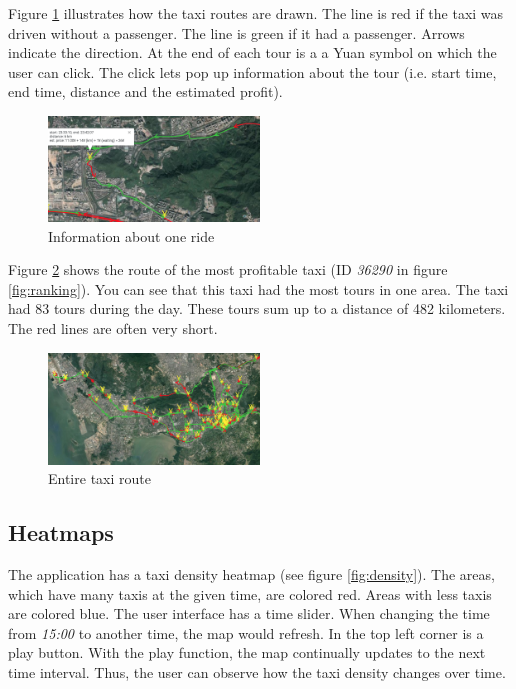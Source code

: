 \documentclass[10pt]{sig-alternate}
\begin{document}
Figure \ref{fig:single_ride} illustrates how the taxi routes are drawn. The line is red if the taxi was driven without a passenger. The line is green if it had a passenger. Arrows indicate the direction. At the end of each tour is a a Yuan symbol on which the user can click. The click lets pop up information about the tour (i.e. start time, end time, distance and the estimated profit).\\

\begin{figure}[ht]
\centering
\includegraphics[width=0.5\textwidth]{img/single_ride.png}
\caption{Information about one ride}
\label{fig:single_ride}
\end{figure}

Figure \ref{fig:best_taxi} shows the route of the most profitable taxi (ID \textit{36290} in figure \ref{fig:ranking}). You can see that this taxi had the most tours in one area. The taxi had 83 tours during the day. These tours sum up to a distance of 482 kilometers. The red lines are often very short.

\begin{figure}[ht]
\centering
\includegraphics[width=0.5\textwidth]{img/best_taxi.png}
\caption{Entire taxi route}
\label{fig:best_taxi}
\end{figure}

\subsection{Heatmaps}
\label{sec:heatmaps}

The application has a taxi density heatmap (see figure \ref{fig:density}). The areas, which have many taxis at the given time, are colored red. Areas with less taxis are colored blue. The user interface has a time slider. When changing the time from \textit{15:00} to another time, the map would refresh. In the top left corner is a play button. With the play function, the map continually updates to the next time interval. Thus, the user can observe how the taxi density changes over time.
\end{document}
